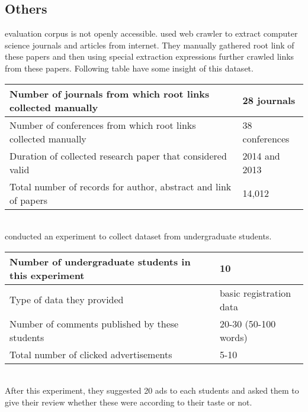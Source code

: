 \subsection{Others}
evaluation corpus is not openly accessible.
\cite{N5} used web crawler to extract computer science journals and articles from internet. They manually gathered root link of these papers and then using special extraction expressions further crawled links from these papers. Following table have some insight of this dataset. 
\\
\begin{table}[!htbp] 
\centering
\footnotesize
\def\arraystretch{1.4}%
\centering
\begin{tabular}{|p{8cm}|p{2cm}|}
\hline
Number of journals from which root links collected manually & 28 journals
\\
\hline
Number of conferences from which root links collected manually & 38 conferences
\\
\hline 
Duration of collected research paper that considered valid & 2014 and 2013
\\
\hline 
Total number of records for author, abstract and link of papers & 14,012
\\
\hline
\end{tabular}

\end{table}
\\
\cite{N9} conducted an experiment to collect dataset from undergraduate students. 
\\
\begin{table}[!htbp] 
\centering
\footnotesize
\def\arraystretch{1.4}%
\centering
\begin{tabular}{|p{8cm}|p{2cm}|}
\hline
Number of undergraduate students in this experiment & 10
\\
\hline
Type of data they provided & basic registration data
\\
\hline 
Number of comments published by these students & 20-30 (50-100 words)
\\
\hline 
Total number of clicked advertisements & 5-10
\\
\hline
\end{tabular}

\end{table}
\\
After this experiment, they suggested 20 ads to each students and asked them to give their review whether these were according to their taste or not.
